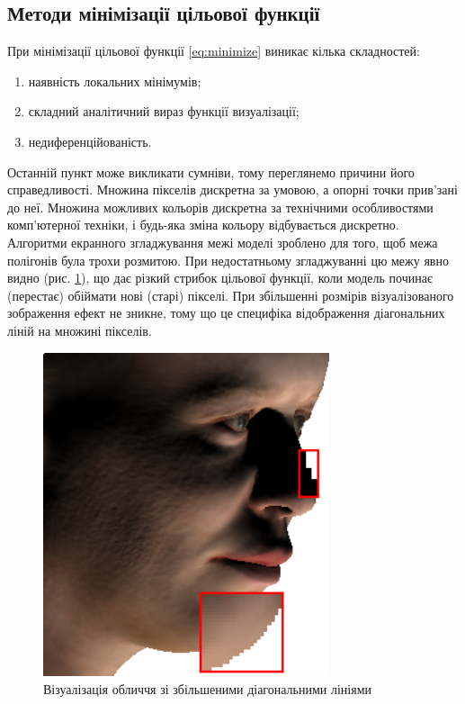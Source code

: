 \subsection{Методи мінімізації цільової функції}

При мінімізації цільової функції \eqref{eq:minimize}
виникає кілька складностей:
\begin{enumerate}
  \item наявність локальних мінімумів;
  \item складний аналітичний вираз функції визуалізації;
  \item недиференційованість.
\end{enumerate}

Останній пункт може викликати сумніви,
тому переглянемо причини його справедливості.
Множина пікселів дискретна за умовою, а опорні точки прив'зані до неї.
Множина можливих кольорів дискретна за технічними особливостями
комп'ютерної техніки, і будь-яка зміна кольору відбувається дискретно.
Алгоритми екранного згладжування межі моделі зроблено для того,
щоб межа полігонів була трохи розмитою.
При недостатньому згладжуванні цю межу явно видно
(рис. \ref{fig:calculation:smoothing-issue}),
що дає різкий стрибок цільової функції,
коли модель починає (перестає) обіймати нові (старі) пікселі.
При збільшенні розмірів візуалізованого зображення ефект не зникне,
тому що це специфіка відображення діагональних ліній
на множині пікселів.

\begin{figure}[h]
  \centering
  \includegraphics[width=0.75\textwidth]{images/face-unsmoothed.png}
  \caption{Візуалізація обличчя зі збільшеними діагональними лініями}
  \label{fig:calculation:smoothing-issue}
\end{figure}

